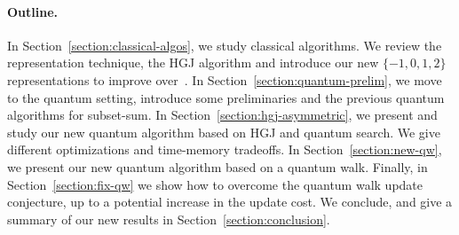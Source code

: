 



\paragraph{Outline.}
In Section~\ref{section:classical-algos}, we study classical algorithms. We review the representation technique, the HGJ algorithm and introduce our new $\{-1,0,1,2\}$ representations to improve over~\cite{DBLP:conf/eurocrypt/BeckerCJ11}. In Section~\ref{section:quantum-prelim}, we move to the quantum setting, introduce some preliminaries and the previous quantum algorithms for subset-sum. In Section~\ref{section:hgj-asymmetric}, we present and study our new quantum algorithm based on HGJ and quantum search. We give different optimizations and time-memory tradeoffs. In Section~\ref{section:new-qw}, we present our new quantum algorithm based on a quantum walk. Finally, in Section~\ref{section:fix-qw} we show how to overcome the quantum walk update conjecture, up to a potential increase in the update cost. We conclude, and give a summary of our new results in Section~\ref{section:conclusion}.

